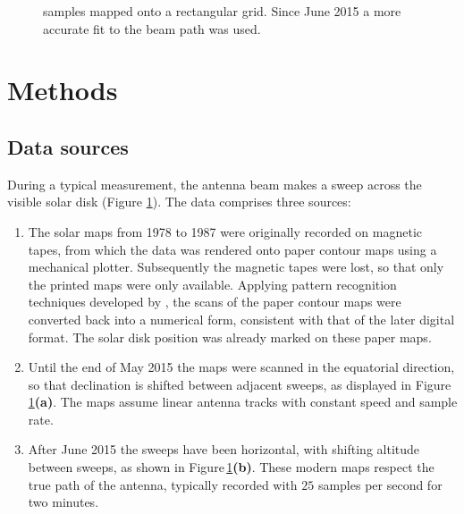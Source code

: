\documentclass{aa}
\begin{document}
\begin{figure}
{    samples mapped onto a rectangular grid.
    Since June 2015 a more accurate fit to the beam path was used.
  \label{oldmap}\label{typicalmap}}
  \end{figure}
\section{Methods}\label{sect:methods}

\subsection{Data sources}\label{sect:source}

  During a typical measurement, the antenna beam makes a sweep across the
  visible solar disk (Figure \ref{typicalmap}).
  The data comprises three sources:
  \begin{enumerate}[A]
    \item
    The solar maps from 1978 to 1987 were originally recorded on magnetic
    tapes, from which the data was rendered onto paper contour maps using a
    mechanical plotter.
    Subsequently the magnetic tapes were lost, so that only the printed maps
    were only available. 
    Applying pattern recognition techniques developed by
    \cite{masterthesis}, the scans of the paper contour maps were converted
    back into a numerical form, consistent with that of the later 
    digital format.
    The solar disk position was already marked on these paper maps.
    \item
    Until the end of May 2015 the maps were scanned in the equatorial direction,
    so that declination is shifted between adjacent sweeps, as displayed in
    Figure\,\ref{typicalmap}{\bf(a)}.
    The maps assume linear antenna tracks with constant speed and sample rate.
    \item
    After June 2015 the sweeps have been horizontal, with shifting altitude
    between sweeps, as shown in Figure\,\ref{typicalmap}{\bf(b)}.
    These modern maps respect the true path of the antenna, typically recorded
    with $25$ samples per second for two minutes.
  \end{enumerate}
\end{document}
